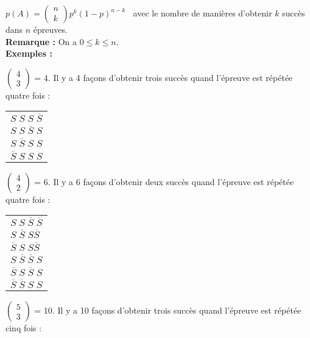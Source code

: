 $ p\left(A\right)  = \left(\begin{array}{c} n \\ k \end{array} \right) p^k \left(1-p\right)^{n-k} \; \;  $ avec le nombre de manières d'obtenir $k$ succès dans $n$ épreuves. \\

\textbf{Remarque :} On a $ 0 \leq k \leq n $.  \\

\textbf{Exemples :}

$\left(\begin{array}{c} 4 \\ 3 \end{array} \right)$ = 4. Il y a 4 façons d'obtenir trois succès quand l'épreuve est répétée quatre fois :

\begin{tabular}{l}
$ S \; S \; S \; \overline{S} $ \\
$ S \; S  \; \overline{S} \; S $ \\
$ S \; \overline{S} \; S \; S $ \\
$ \overline{S} \; S \; S \; S $ \\
\end{tabular}

\vspace{.3cm}

$\left(\begin{array}{c} 4 \\ 2 \end{array} \right)$ = 6. Il y a 6 façons d'obtenir deux succès quand l'épreuve est répétée quatre fois :

\begin{tabular}{l}
$ S \; S \; \overline{S} \; \overline{S} $ \\
$ S \; \overline{S} \; S \overline{S} $ \\
$ \overline{S} \; S \; S \overline{S} $ \\
$ S \; \overline{S}  \; \overline{S} \; S $ \\
$ \overline{S} \; S \; \overline{S} \; S $ \\
$ \overline{S} \; \overline{S} \; S \; S $ \\
\end{tabular}

\vspace{.3cm}

$\left(\begin{array}{c} 5 \\ 3 \end{array} \right)$ = 10. Il y a 10 façons d'obtenir trois succès quand l'épreuve est répétée cinq fois :

